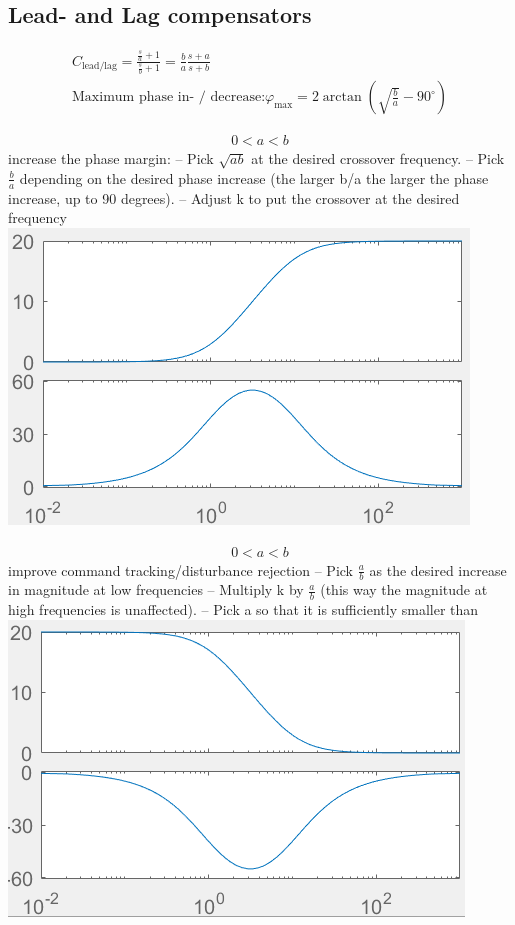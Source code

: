 \subsection{Lead- and Lag compensators}
    \begin{align*}
        C_{\text{lead/lag}} = \frac{\frac{s}{a} + 1}{\frac{s}{b} + 1} = \frac{b}{a} \frac{s+a}{s+b}\\
        \text{Maximum phase in- / decrease:} \varphi_{\text{max}} = 2 \arctan\left(\sqrt{\frac{b}{a}} - 90^{\circ}\right)
    \end{align*}
    
        \begin{align*}
            0 < a < b
        \end{align*}
        increase the phase margin:
– Pick $\sqrt{ab}$ at the desired crossover frequency.
– Pick $\frac{b}{a}$ depending on the desired phase increase (the larger b/a the larger the phase
increase, up to 90 degrees).
– Adjust k to put the crossover at the desired frequency
        \includegraphics[width = \linewidth]{src/images/lead-controller.png}
    
        \begin{align*}
            0 < a < b
        \end{align*}
        improve command tracking/disturbance
rejection
– Pick $\frac{a}{b}$ as the desired increase in magnitude at low frequencies
– Multiply k by $\frac{a}{b}$ (this way the magnitude at high frequencies is unaffected).
– Pick a so that it is sufficiently smaller than
        \includegraphics[width = \linewidth]{src/images/lag-controller.png}

